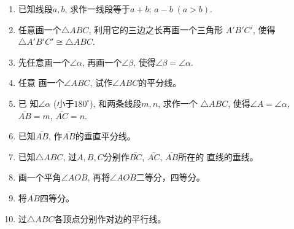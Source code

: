 \begin{solution}
    
\end{solution}


\begin{example}
    
\end{example}

\begin{solution}
    
\end{solution}


\begin{example}
    
\end{example}
\begin{solution}
    
\end{solution}


\begin{example}
    
\end{example}


\begin{solution}
    
\end{solution}

\begin{ex}
\begin{enumerate}
	\item 已知线段$a,b$, 求作一线段等于$a+b$; $a-b\; (a>b)$.
	\item 任意画一个$\triangle ABC$, 利用它的三边之长再画一个三角形
$A'B'C'$, 使得$\triangle A'B'C'\cong \triangle ABC$.
	\item 先任意画一个$\angle \alpha$, 再画一个$\angle \beta$, 使得$\angle \beta=\angle\alpha$.
	\item 任意
	画一个$\angle ABC$, 试作$\angle ABC$的平分线。
	\item 已
	知$\angle \alpha$ (小于$180^{\circ}$), 和两条线段$m,n$, 求作一个
	$\triangle 
	ABC$, 使得$\angle A=\angle \alpha$, $\overline{AB}=m$, $\overline{AC}=n$.
	\item 已知$\overline{AB}$, 作$\overline{AB}$的垂直平分线。
	\item 已知$\triangle ABC$, 过$A,B,C$分别作$\overline{BC}$, $\overline{AC}$, $\overline{AB}$所在的
	直线的垂线。
	\item 画一个平角$\angle AOB$, 再将$\angle AOB$二等分，四等分。
	\item 将$\overline{AB}$四等分。
	\item 过$\triangle ABC$各顶点分别作对边的平行线。
\end{enumerate}
\end{ex}

